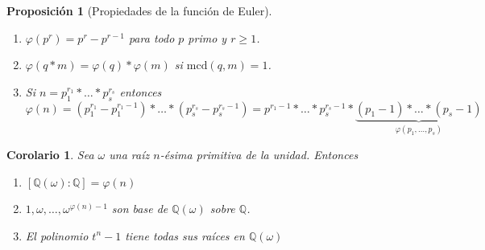 \documentclass[10pt, spanish]{report}
\newtheorem*{prop*}{Proposición}
\newtheorem{cor}{Corolario}[tma]
\theoremstyle{definition}
\theoremstyle{custom}
\theoremstyle{remark}
\newcommand{\Q}{\mathbb{Q}}
\newcommand{\mcd}[1]{\text{mcd}(#1)}
\renewcommand{\geq}{\geqslant}
\newcommand{\fecha}[1]{\marginpar{\underline{\footnotesize{#1}}}}
\begin{document}
\fecha{7/04} 
\begin{prop*}[Propiedades de la función de Euler]\hspace{0pt}
    \begin{enumerate}
        \item $\varphi(p^r)=p^r-p^{r-1}$ para todo $p$ primo y $r\geq1$.
        \item $\varphi(q*m)=\varphi(q)*\varphi(m)$ si $\mcd{q,m}=1$.
        \item Si $n=p_1^{r_1}*\ldots*p_s^{r_s}$ entonces \[\varphi(n)=\left(
                p_1^{r_1}-p_1^{r_1-1} \right) *\ldots*\left(
            p_s^{r_s}-p_s^{r_s-1}\right)=
        p^{r_1-1}*\ldots*p_s^{r_s-1}*\underbrace{(p_1-1)*\ldots*(p_s-1)}_{\varphi(p_1,\ldots,p_s)}\] 
    \end{enumerate}
\end{prop*}

\begin{cor}
    Sea $\omega$ una raíz $n$-ésima primitiva de la unidad. Entonces
    \begin{enumerate}
        \item $\left[ \Q(\omega):\Q \right] =\varphi(n)$
        \item $1,\omega,\ldots,\omega^{\varphi(n)-1}$ son base de $\Q(\omega)$
            sobre $\Q$.  
        \item El polinomio $t^n-1$ tiene todas sus raíces en $\Q(\omega)$  
    \end{enumerate}
\end{cor}
\end{document}

